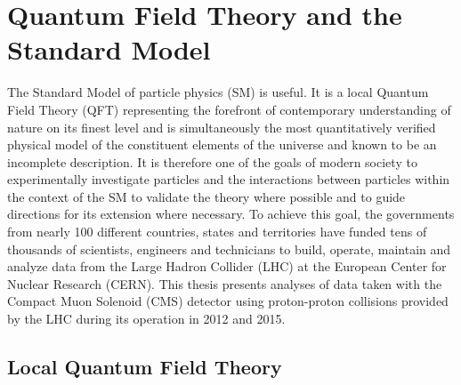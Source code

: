 
\chapter{Quantum Field Theory and the Standard Model}\label{sec:introduction}

 The Standard Model of particle physics (SM) is useful.
 It is a local Quantum Field Theory (QFT) representing
  the forefront of contemporary understanding 
  of nature on its finest level and is simultaneously the
  most quantitatively verified physical model of the
  constituent elements of the universe
  and known to be an incomplete description.
 It is therefore one of the goals of modern society
  to experimentally investigate particles and the
  interactions between
  particles within the context of the SM
  to validate the theory where possible
  and to guide directions for its extension where necessary.
 To achieve this goal, the governments from 
  nearly 100 %
  different countries, states and territories have  
  funded tens of thousands of scientists, engineers 
  and technicians to build, operate, maintain 
  and analyze data from the
  Large Hadron Collider (LHC)
  at the European Center for Nuclear Research (CERN).
 This thesis presents analyses of data taken
  with the Compact Muon Solenoid (CMS) detector
  using proton-proton collisions provided by the LHC
  during its operation in 2012 and 2015.
  
%

\section{Local Quantum Field Theory}

